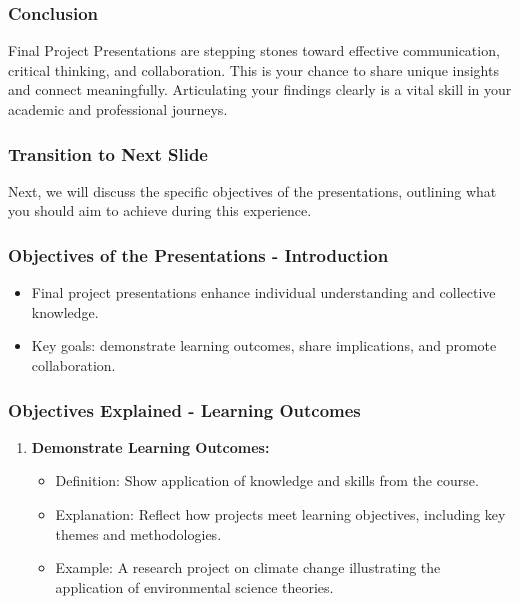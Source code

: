 \documentclass{beamer}
\begin{document}
\begin{frame}[fragile]
    \frametitle{Conclusion}
    Final Project Presentations are stepping stones toward effective communication, critical thinking, and collaboration. 
    This is your chance to share unique insights and connect meaningfully. Articulating your findings clearly is a vital skill in your academic and professional journeys.
\end{frame}

\begin{frame}[fragile]
    \frametitle{Transition to Next Slide}
    Next, we will discuss the specific objectives of the presentations, outlining what you should aim to achieve during this experience.
\end{frame}

\begin{frame}[fragile]
    \frametitle{Objectives of the Presentations - Introduction}
    \begin{itemize}
        \item Final project presentations enhance individual understanding and collective knowledge.
        \item Key goals: demonstrate learning outcomes, share implications, and promote collaboration.
    \end{itemize}
\end{frame}

\begin{frame}[fragile]
    \frametitle{Objectives Explained - Learning Outcomes}
    \begin{enumerate}
        \item \textbf{Demonstrate Learning Outcomes:}
        \begin{itemize}
            \item Definition: Show application of knowledge and skills from the course.
            \item Explanation: Reflect how projects meet learning objectives, including key themes and methodologies.
            \item Example: A research project on climate change illustrating the application of environmental science theories.
        \end{itemize}
    \end{enumerate}
\end{frame}
\end{document}
